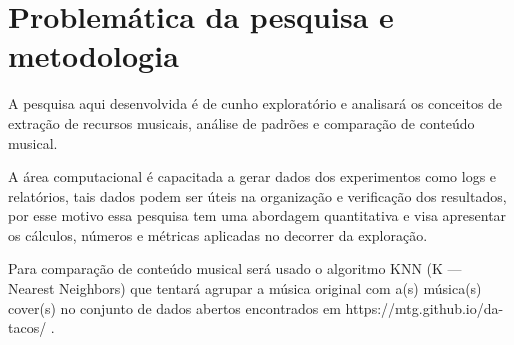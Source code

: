 \chapter{Problemática da pesquisa e metodologia}

A pesquisa aqui desenvolvida é de cunho exploratório e analisará os conceitos de extração de recursos musicais, análise de padrões e comparação de conteúdo musical.

A área computacional é capacitada a gerar dados dos experimentos como logs e relatórios, tais dados podem ser úteis na organização e verificação dos resultados, por esse motivo essa pesquisa tem uma abordagem quantitativa e visa apresentar os cálculos, números e métricas aplicadas no decorrer da exploração.

Para comparação de conteúdo musical será usado o algoritmo KNN (K — Nearest Neighbors) que tentará agrupar a música original com a(s) música(s) cover(s) no conjunto de dados abertos encontrados em https://mtg.github.io/da-tacos/ \cite{yesiler2019}.

